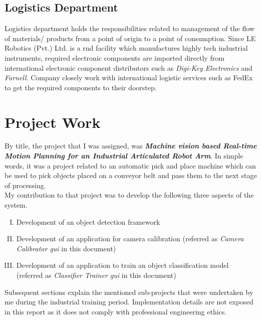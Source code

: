 \documentclass[a4paper,12pt]{report}
\begin{document}
\section{Logistics Department}

Logistics department holds the responsibilities related to management of the flow of materials/ products from a point of origin to a point of consumption. Since LE Robotics (Pvt.) Ltd. is a \ac{rnd} facility which manufactures highly tech industrial instruments, required electronic components are imported directly from international electronic component distributors such as \textit{Digi-Key Electronics} and \textit{Farnell}. Company closely work with international logistic services such as FedEx to get the required components to their doorstep.

\chapter{Project Work}
\label{Project Work}
By title, the project that I was assigned, was \textbf{\textit{Machine vision based Real-time Motion Planning for an Industrial Articulated Robot Arm}}. In simple words, it was a project related to an automatic pick and place machine which can be used to pick objects placed on a conveyor belt and pass them to the next stage of processing.\\

My contribution to that project was to develop the following three aspects of the system. 

\begin{enumerate}[I.]
	\item Development of an object detection framework
	
	\item Development of an application for camera calibration (referred as \textit{Camera Calibrator \ac{gui}} in this document)
	
	\item Development of an application to train an object classification model (referred as \textit{Classifier Trainer \ac{gui}} in this document)
	
\end{enumerate}

Subsequent sections explain the mentioned sub-projects that were undertaken by me during the industrial training period. Implementation details are not exposed in this report as it does not comply with professional engineering ethics.
\end{document}
